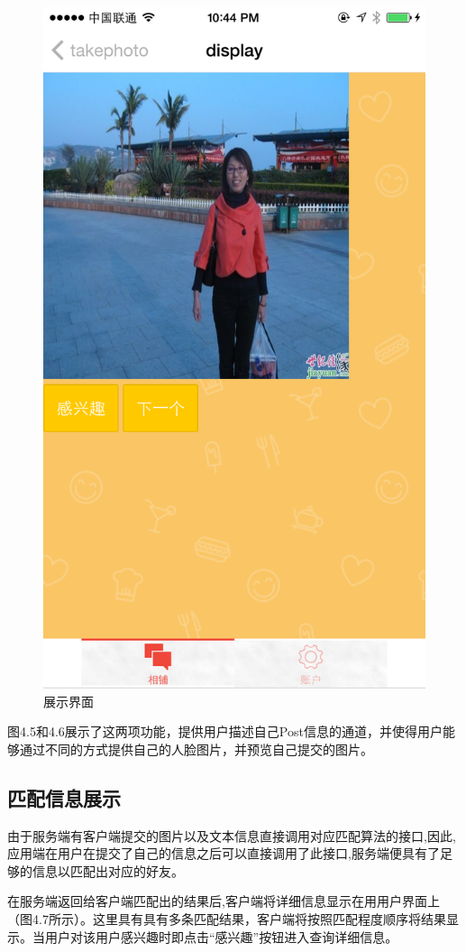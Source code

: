 \begin{figure}[h]
\begin{minipage}[t]{0.3\linewidth}
\includegraphics[width=\textwidth]{img/chap4/display.PNG}
\caption{展示界面\label{instagram}}
\end{minipage}



\end{figure}
图4.5和4.6展示了这两项功能，提供用户描述自己Post信息的通道，并使得用户能够通过不同的方式提供自己的人脸图片，并预览自己提交的图片。
\subsection{匹配信息展⽰}
由于服务端有客户端提交的图片以及文本信息直接调用对应匹配算法的接口,因此,应用端在用户在提交了自己的信息之后可以直接调用了此接口,服务端便具有了足够的信息以匹配出对应的好友。

在服务端返回给客户端匹配出的结果后,客户端将详细信息显⽰在⽤用户界⾯上（图4.7所示）。这里具有具有多条匹配结果，客户端将按照匹配程度顺序将结果显⽰。当用户对该用户感兴趣时即点击“感兴趣”按钮进入查询详细信息。




